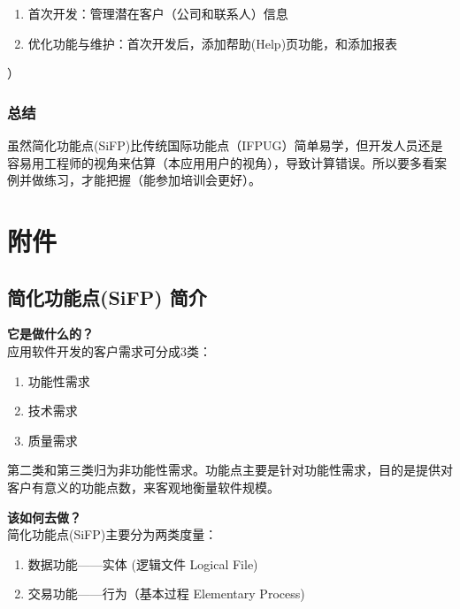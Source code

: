 \begin{enumerate}
\tightlist
\item
  首次开发：管理潜在客户（公司和联系人）信息
\item
  优化功能与维护：首次开发后，添加帮助(Help)页功能，和添加报表
\end{enumerate}

）

\hypertarget{ux603bux7ed3}{%
\subsubsection{总结}\label{ux603bux7ed3}}

虽然简化功能点(SiFP)比传统国际功能点（IFPUG）简单易学，但开发人员还是容易用工程师的视角来估算（本应用用户的视角），导致计算错误。所以要多看案例并做练习，才能把握（能参加培训会更好）。

\hypertarget{ux9644ux4ef6}{%
\section{附件}\label{ux9644ux4ef6}}

\hypertarget{ux7b80ux5316ux529fux80fdux70b9sifp-ux7b80ux4ecb}{%
\subsection{简化功能点(SiFP)
简介}\label{ux7b80ux5316ux529fux80fdux70b9sifp-ux7b80ux4ecb}}

 \textbf{它是做什么的？} \\
应用软件开发的客户需求可分成3类：

\begin{enumerate}
\tightlist
\item
  功能性需求
\item
  技术需求
\item
  质量需求
\end{enumerate}

第二类和第三类归为非功能性需求。功能点主要是针对功能性需求，目的是提供对客户有意义的功能点数，来客观地衡量软件规模。

 \textbf{该如何去做？} \\
简化功能点(SiFP)主要分为两类度量：

\begin{enumerate}
\tightlist
\item
  数据功能------实体 (逻辑文件 Logical File)
\item
  交易功能------行为（基本过程 Elementary Process)
\end{enumerate}

